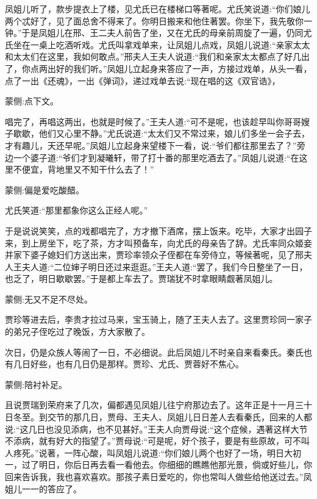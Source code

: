 \begin{parag}
    凤姐儿听了，款步提衣上了楼，见尤氏已在楼梯口等著呢。尤氏笑说道:“你们娘儿两个忒好了，见了面总舍不得来了。你明日搬来和他住著罢。你坐下，我先敬你一钟。”于是凤姐儿在邢、王二夫人前告了坐，又在尤氏的母亲前周旋了一遍，仍同尤氏坐在一桌上吃酒听戏。尤氏叫拿戏单来，让凤姐儿点戏，凤姐儿说道:“亲家太太和太太们在这里，我如何敢点。”邢夫人王夫人说道:“我们和亲家太太都点了好几出了，你点两出好的我们听。”凤姐儿立起身来答应了一声，方接过戏单，从头一看，点了一出《还魂》，一出《弹词》，递过戏单去说:“现在唱的这《双官诰》，\begin{note}蒙侧:点下文。\end{note}唱完了，再唱这两出，也就是时候了。”王夫人道:“可不是呢，也该趁早叫你哥哥嫂子歇歇，他们又心里不静。”尤氏说道:“太太们又不常过来，娘儿们多坐一会子去，才有趣儿，天还早呢。”凤姐儿立起身来望楼下一看，说:“爷们都往那里去了？”旁边一个婆子道:“爷们才到凝曦轩，带了打十番的那里吃酒去了。”凤姐儿说道:“在这里不便宜，背地里又不知干什么去了！”\begin{note}蒙侧:偏是爱吃酸醋。\end{note}尤氏笑道:“那里都象你这么正经人呢。”
\end{parag}


\begin{parag}
    于是说说笑笑，点的戏都唱完了，方才撤下酒席，摆上饭来。吃毕，大家才出园子来，到上房坐下，吃了茶，方才叫预备车，向尤氏的母亲告了辞。尤氏率同众姬妾并家下婆子媳妇们方送出来，贾珍率领众子侄都在车旁侍立，等候著呢，见了邢夫人王夫人道:“二位婶子明日还过来逛逛。”王夫人道:“罢了，我们今日整坐了一日，也乏了，明日歇歇罢。”于是都上车去了。贾瑞犹不时拿眼睛觑著凤姐儿。\begin{note}蒙侧:无又不足不尽处。\end{note}贾珍等进去后，李贵才拉过马来，宝玉骑上，随了王夫人去了。这里贾珍同一家子的弟兄子侄吃过了晚饭，方大家散了。
\end{parag}


\begin{parag}
    次日，仍是众族人等闹了一日，不必细说。此后凤姐儿不时亲自来看秦氏。秦氏也有几日好些，也有几日仍是那样。贾珍、尤氏、贾蓉好不焦心。\begin{note}蒙侧:陪衬补足。\end{note}
\end{parag}


\begin{parag}
    且说贾瑞到荣府来了几次，偏都遇见凤姐儿往宁府那边去了。这年正是十一月三十日冬至。到交节的那几日，贾母、王夫人、凤姐儿日日差人去看秦氏，回来的人都说:“这几日也没见添病，也不见甚好。”王夫人向贾母说:“这个症候，遇著这样大节不添病，就有好大的指望了。”贾母说:“可是呢，好个孩子，要是有些原故，可不叫人疼死。”说著，一阵心酸，叫凤姐儿说道:“你们娘儿两个也好了一场，明日大初一，过了明日，你后日再去看一看他去。你细细的瞧瞧他那光景，倘或好些儿，你回来告诉我，我也喜欢喜欢。那孩子素日爱吃的，你也常叫人做些给他送过去。”凤姐儿一一的答应了。
\end{parag}



